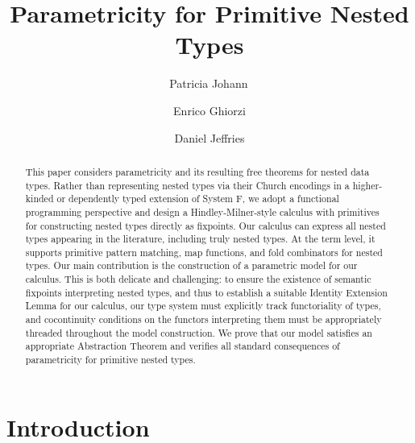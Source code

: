 \documentclass[runningheads]{llncs}
\begin{document}

\title{Parametricity for Primitive Nested Types\vspace*{-0.2in}} 
\author{Patricia Johann\,\Letter \and Enrico Ghiorzi
\and Daniel Jeffries \vspace*{-0.12in}} 

\maketitle

\begin{abstract}

\vspace*{-0.25in}

This paper considers parametricity and its resulting free theorems for
nested data types. Rather than representing nested types via their
Church encodings in a higher-kinded or dependently typed extension of
System F, we adopt a functional programming perspective and design a
Hindley-Milner-style calculus with primitives for constructing nested
types directly as fixpoints. Our calculus can express all nested types
appearing in the literature, including truly nested types. At the term
level, it supports primitive pattern matching, map functions, and fold
combinators for nested types. Our main contribution is the
construction of a parametric model for our calculus. This is both
delicate and challenging: to ensure the existence of semantic
fixpoints interpreting nested types, and thus to establish a suitable
Identity Extension Lemma for our calculus, our type system must
explicitly track functoriality of types, and cocontinuity conditions
on the functors interpreting them must be appropriately threaded
throughout the model construction. We prove that our model satisfies
an appropriate Abstraction Theorem and verifies all standard
consequences of parametricity for primitive nested types.
\end{abstract}

\vspace*{-0.4in}

\section{Introduction}\label{sec:intro}
\end{document}
